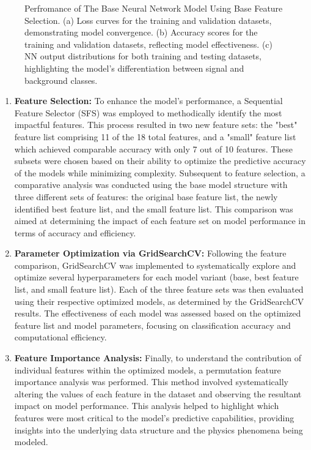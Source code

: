 \documentclass[]{article}
\begin{document}
\begin{figure}[ht]
	\caption{Perfromance of The Base Neural Network Model Using Base Feature Selection. (a) Loss curves for the training and validation datasets, demonstrating model convergence. (b) Accuracy scores for the training and validation datasets, reflecting model effectiveness. (c) NN output distributions for both training and testing datasets, highlighting the model's differentiation between signal and background classes.}
	\label{fig:base_model_plots}
\end{figure}


\begin{enumerate}
\item \textbf{Feature Selection:}
To enhance the model's performance, a Sequential Feature Selector (SFS) was employed to methodically identify the most impactful features. This process resulted in two new feature sets: the "best" feature list comprising 11 of the 18 total features, and a "small" feature list which achieved comparable accuracy with only 7 out of 10 features. These subsets were chosen based on their ability to optimize the predictive accuracy of the models while minimizing complexity. Subsequent to feature selection, a comparative analysis was conducted using the base model structure with three different sets of features: the original base feature list, the newly identified best feature list, and the small feature list. This comparison was aimed at determining the impact of each feature set on model performance in terms of accuracy and efficiency.

\item \textbf{Parameter Optimization via GridSearchCV:}
Following the feature comparison, GridSearchCV was implemented to systematically explore and optimize several hyperparameters for each model variant (base, best feature list, and small feature list). Each of the three feature sets was then evaluated using their respective optimized models, as determined by the GridSearchCV results. The effectiveness of each model was assessed based on the optimized feature list and model parameters, focusing on classification accuracy and computational efficiency.

\item \textbf{Feature Importance Analysis:}
Finally, to understand the contribution of individual features within the optimized models, a permutation feature importance analysis was performed. This method involved systematically altering the values of each feature in the dataset and observing the resultant impact on model performance. This analysis helped to highlight which features were most critical to the model’s predictive capabilities, providing insights into the underlying data structure and the physics phenomena being modeled.
\end{enumerate}
\end{document}
